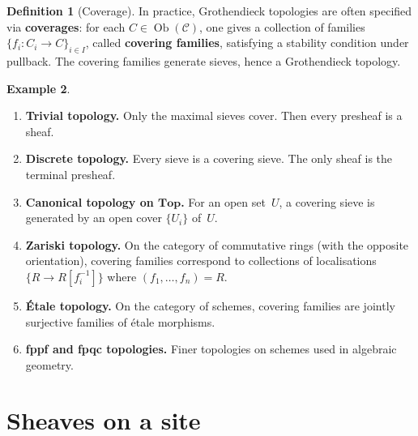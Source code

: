 \documentclass[a4paper,12pt]{book}
\DeclareMathOperator{\Ob}{Ob}
\newcommand{\Top}{\mathbf{Top}}
\theoremstyle{definition}
\newtheorem{definition}{Definition}[section]
\newtheorem{example}[definition]{Example}
\theoremstyle{plain}
\theoremstyle{remark}
\begin{document}
\begin{definition}[Coverage]\label{def:coverage}
In practice, Grothendieck topologies are often specified via
\textbf{coverages}: for each $C\in\Ob(\mathcal{C})$, one gives a
collection of families $\{f_i\colon C_i\to C\}_{i\in I}$, called
\textbf{covering families}, satisfying a stability condition under
pullback.  The covering families generate sieves, hence a Grothendieck
topology.
\end{definition}

\begin{example}\label{ex:topologies}
\begin{enumerate}[label=(\roman*)]
\item \textbf{Trivial topology.}
      Only the maximal sieves cover.  Then every presheaf is a sheaf.
\item \textbf{Discrete topology.}
      Every sieve is a covering sieve.  The only sheaf is the terminal
      presheaf.
\item \textbf{Canonical topology on $\Top$.}
      For an open set~$U$, a covering sieve is generated by an
      open cover $\{U_i\}$ of~$U$.
\item \textbf{Zariski topology.}
      On the category of commutative rings (with the opposite orientation),
      covering families correspond to collections of localisations
      $\{R\to R[f_i^{-1}]\}$ where $(f_1,\ldots,f_n) = R$.
\item \textbf{\'Etale topology.}
      On the category of schemes, covering families are jointly surjective
      families of \'etale morphisms.
\item \textbf{fppf and fpqc topologies.}
      Finer topologies on schemes used in algebraic geometry.
\end{enumerate}
\end{example}



\section{Sheaves on a site}\label{sec:sheaves-site}
\end{document}
